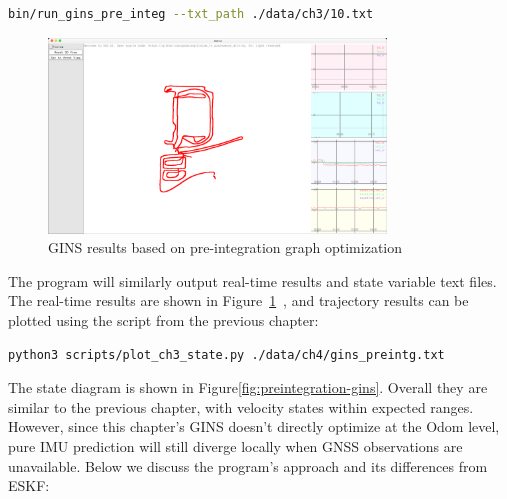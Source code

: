 \begin{lstlisting}[language=sh,caption=Terminal command:]
	bin/run_gins_pre_integ --txt_path ./data/ch3/10.txt 
\end{lstlisting}

\begin{figure}[!htp]
	\centering
	\includegraphics[width=0.8\textwidth]{resources/preintegration/gins-preinteg.png}
	\caption{GINS results based on pre-integration graph optimization}
	\label{fig:gins-preinteg}
\end{figure}

The program will similarly output real-time results and state variable text files. The real-time results are shown in Figure~\ref{fig:gins-preinteg}~, and trajectory results can be plotted using the script from the previous chapter:

\begin{lstlisting}[language=sh,caption=Terminal command:]
	python3 scripts/plot_ch3_state.py ./data/ch4/gins_preintg.txt
\end{lstlisting}

The state diagram is shown in Figure\ref{fig:preintegration-gins}. Overall they are similar to the previous chapter, with velocity states within expected ranges. However, since this chapter's GINS doesn't directly optimize at the Odom level, pure IMU prediction will still diverge locally when GNSS observations are unavailable. Below we discuss the program's approach and its differences from ESKF:

